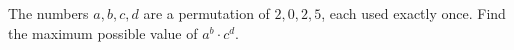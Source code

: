 The numbers $a, b, c, d$ are a permutation of $2, 0, 2, 5$, each used exactly once. Find the maximum possible value of $a^{b} \cdot c^{d}$.
